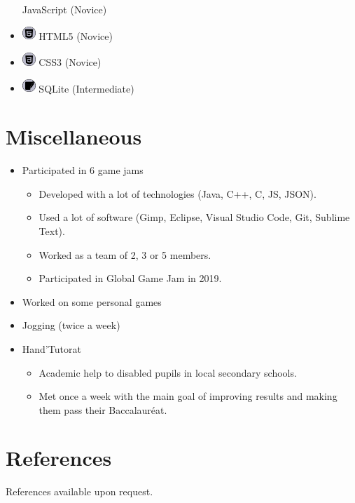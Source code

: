 \documentclass[11pt, a4paper, sans]{moderncv}
\begin{document}
\begin{multicols}{3}
\begin{itemize}
		JavaScript \footnotesize(Novice)\normalsize
	\item 
		\includegraphics[align=c,width=5mm,height=5mm]{html.png}
		HTML5 \footnotesize(Novice)\normalsize
	\item 
		\includegraphics[align=c,width=5mm,height=5mm]{css.png}
		CSS3 \footnotesize(Novice)\normalsize
	\item 
		\includegraphics[align=c,width=5mm,height=5mm]{sqlite.png}
		SQLite \footnotesize(Intermediate)\normalsize
	\end{itemize}
\end{multicols}

\section{Miscellaneous}
\begin{itemize}[label=\textbullet]
	\item Participated in 6 game jams 
		\begin{itemize}
			\item Developed with a lot of technologies (Java, C++, C, JS, JSON).
			\item Used a lot of software (Gimp, Eclipse, Visual Studio Code, Git, Sublime Text).
			\item Worked as a team of 2, 3 or 5 members.
			\item Participated in Global Game Jam in 2019.
		\end{itemize}
	\item Worked on some personal games
	\item Jogging (twice a week)
	\item Hand'Tutorat
	\begin{itemize}
			\item Academic help to disabled pupils in local secondary schools.
			\item Met once a week with the main goal of improving results and making them pass their Baccalauréat.
	\end{itemize}
\end{itemize}

\section{References}
References available upon request.
\end{document}
